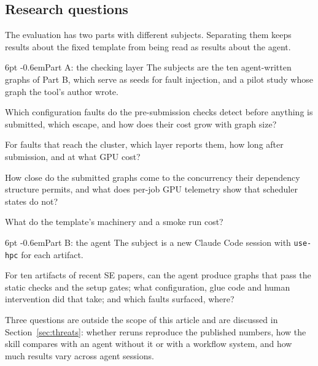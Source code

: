 \documentclass[pdflatex,sn-mathphys-num]{sn-jnl}
\makeatletter
\theoremstyle{thmstyletwo}%
\theoremstyle{thmstylethree}%
\newcommand{\tool}{\texttt{use-hpc}}
\newcommand{\RQ}[1]{\textbf{RQ#1}}
\renewcommand\paragraph{\@startsection{paragraph}{4}{\z@}%
  {6pt \@plus 2pt \@minus 1pt}{-0.6em}{\normalfont\normalsize\bfseries}}
\makeatother
\begin{document}
\subsection{Research questions}\label{sec:rqs}

The evaluation has two parts with different subjects. Separating them keeps results about the fixed template from being read as results about the agent.

\paragraph{Part A: the checking layer} The subjects are the ten agent-written graphs of Part B, which serve as seeds for fault injection, and a pilot study whose graph the tool's author wrote.
\begin{description}[leftmargin=1.1em, style=nextline, itemsep=2pt]
\item[\RQ{1} Static checking] Which configuration faults do the pre-submission checks detect before anything is submitted, which escape, and how does their cost grow with graph size?
\item[\RQ{2} Fault containment] For faults that reach the cluster, which layer reports them, how long after submission, and at what GPU cost?
\item[\RQ{3} Concurrency and observability] How close do the submitted graphs come to the concurrency their dependency structure permits, and what does per-job GPU telemetry show that scheduler states do not?
\item[\RQ{4} Overhead] What do the template's machinery and a smoke run cost?
\end{description}

\paragraph{Part B: the agent} The subject is a new Claude Code session with \tool{} for each artifact.
\begin{description}[leftmargin=1.1em, style=nextline, itemsep=2pt]
\item[\RQ{5} Feasibility on unseen artifacts] For ten artifacts of recent SE papers, can the agent produce graphs that pass the static checks and the setup gates; what configuration, glue code and human intervention did that take; and which faults surfaced, where?
\end{description}
Three questions are outside the scope of this article and are discussed in Section~\ref{sec:threats}: whether reruns reproduce the published numbers, how the skill compares with an agent without it or with a workflow system, and how much results vary across agent sessions.
\end{document}

